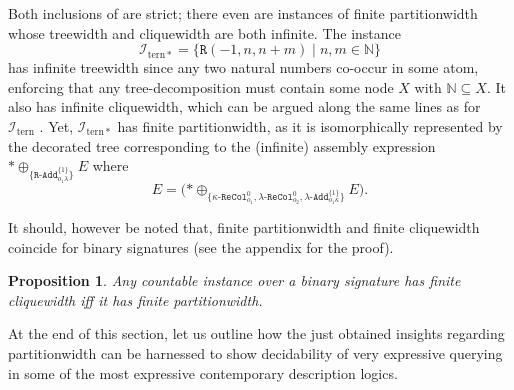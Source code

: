 \documentclass[10pt,a4paper]{amsart}
\theoremstyle{definition}
\numberwithin{equation}{section}
\theoremstyle{plain}
\newtheorem{proposition}[proposition]{Proposition}
\theoremstyle{definition}
\theoremstyle{myexample}
\theoremstyle{plain}
\theoremstyle{definition}
\newcommand{\instance}{\mathcal{I}}
\newcommand{\inst}{\instance}
\newcommand{\cadd}[4]{#4\pred{\texttt{-}Add}^{#3}_{#1#2}} %
\newcommand{\radd}[4]{#4\pred{\texttt{-}Add}^{#3}_{#1#2}}
\newcommand{\recol}[2]{#2\pred{\texttt{-}ReCol}_{#1}}
\newcommand{\ercwidth}{\partitionwidth}
\newcommand{\hypercliquewidth}{\partitionwidth}
\newcommand{\partitionwidth}{par\-ti\-tion\-width}
\newcommand{\pred}[1]{\mathtt{#1}}
\newcommand{\const}[1]{\mathtt{#1}}
\newcommand{\rpred}{\pred{R}}
\newcommand{\iffi}{\textit{iff} } %
\begin{document}



Both inclusions of  are strict; there even are instances of finite \hypercliquewidth{} whose treewidth and cliquewidth are both infinite. The instance 
$$\inst_\mathrm{tern*} = \{ \rpred(-1,n,n{+}m) \mid n,m\in \mathbb{N}\}$$%
has infinite treewidth since any two natural numbers co-occur in some atom, enforcing that any tree-decomposition must contain some node $X$ with $\mathbb{N} \subseteq  X$.  
It also has infinite cliquewidth, which can be argued along the same lines as for $\inst_\mathrm{tern}$ \cite{ICDT2023}.
Yet, $\inst_\mathrm{tern*}$ has finite \ercwidth{}, as it is isomorphically represented by the decorated tree corresponding to the (infinite) assembly expression
$
\const{*} \oplus_{\{
\radd{o_1}{\lambda}{\{1\}}{\rpred}
\}} E
$
where
$$
E = \big( \const{*} \oplus_{\{
\recol{o_1}{\kappa}^0, 
\recol{o_2}{\lambda}^0,
\cadd{o_1}{\kappa}{\{1\}}{\lambda}
\}} E \big).
$$

It should, however be noted that, finite \ercwidth{} and finite cliquewidth coincide for binary signatures (see the appendix for the proof).

\begin{proposition}\label{th:hcw=cw-bin}
	Any countable instance over a binary signature has finite cliquewidth \iffi it has finite \ercwidth{}.
\end{proposition}

At the end of this section, let us outline how the just obtained insights regarding partitionwidth can be harnessed to show decidability of very expressive querying in some of the most expressive contemporary description logics.

\end{document}
